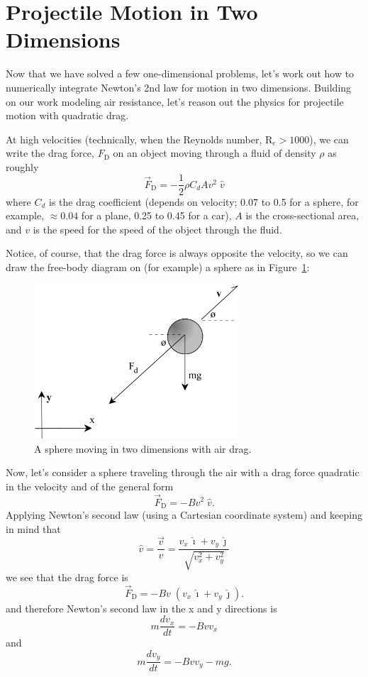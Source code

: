 \pagebreak
%
\section{Projectile Motion in Two Dimensions}
\label{sec-2d}
%
Now that we have solved a few one-dimensional problems, let's work out how to numerically integrate Newton's 2nd law for  motion in two dimensions. Building on our work modeling air resistance, let's reason out the physics for projectile motion with quadratic drag. 

At high velocities (technically, when the Reynolds number, R$_e  > 1000$), we can write the drag force, $F_\mathrm{D}$ on an object moving through a fluid of density $\rho$ as roughly
\begin{equation} 
\vec{F}_{\mathrm{D}} = - \frac{1}{2}\rho C_d A v^2\;\hat{v} 
\label{eq:drag}
\end{equation}
where 
$C_d$ is the drag coefficient (depends on velocity; 0.07 to 0.5 for a sphere, for example, $\approx 0.04$ for a plane, 0.25 to 0.45 for a car), $A$ is the cross-sectional area, and $v$ is the speed for the speed of the object through the fluid.

Notice, of course, that the drag force is always opposite the velocity, so we can draw the free-body diagram on (for example) a sphere as in Figure~\ref{fig:2DFreeBody}:
\begin{figure}\centering
	\includegraphics[width=3.0in]{Figures/Kinematics/2DFreeBody.png}
	\caption{A sphere moving in two dimensions with air drag.}\label{fig:2DFreeBody}
\end{figure}

Now, let's consider a sphere traveling through the air with a drag force quadratic in the velocity and of the general form 
$$  \vec{F}_{\mathrm{D}} = - B v^2\;\hat{v}.   $$
Applying Newton's second law (using a Cartesian coordinate system) and keeping in mind that 
$$\hat{v} = \frac{\vec{v}}{v} = \frac{v_x \,\hat{\imath} + v_y \,\hat{\jmath}}{\sqrt{v_x^2 + v_y^2}}$$
we see that the drag force is 
$$  \vec{F}_{\mathrm{D}} = - B v\;\left(v_x \,\hat{\imath} + v_y \,\hat{\jmath}\right).    $$
and therefore Newton's second law in the x and y directions is 
$$ m \frac{dv_x}{dt} = -B v v_x $$
and 
$$  m \frac{dv_y}{dt} = -B v v_y -mg. $$

